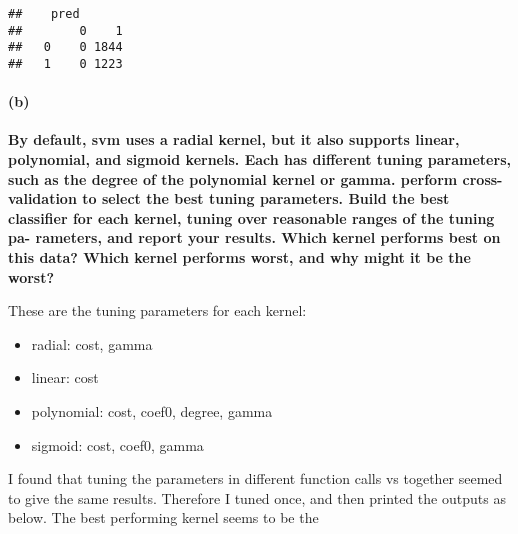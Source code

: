 \documentclass[]{article}
\providecommand{\tightlist}{%
  \setlength{\itemsep}{0pt}\setlength{\parskip}{0pt}}
\let\oldparagraph\paragraph
\renewcommand{\paragraph}[1]{\oldparagraph{#1}\mbox{}}
\begin{document}
\begin{verbatim}
##    pred
##        0    1
##   0    0 1844
##   1    0 1223
\end{verbatim}

\paragraph{(b)}\label{b}

\textbf{By default, svm uses a radial kernel, but it also supports
linear, polynomial, and sigmoid kernels. Each has different tuning
parameters, such as the degree of the polynomial kernel or gamma.
perform cross-validation to select the best tuning parameters. Build the
best classifier for each kernel, tuning over reasonable ranges of the
tuning pa- rameters, and report your results. Which kernel performs best
on this data? Which kernel performs worst, and why might it be the
worst?}

These are the tuning parameters for each kernel:

\begin{itemize}
\tightlist
\item
  radial: cost, gamma
\item
  linear: cost
\item
  polynomial: cost, coef0, degree, gamma
\item
  sigmoid: cost, coef0, gamma
\end{itemize}

I found that tuning the parameters in different function calls vs
together seemed to give the same results. Therefore I tuned once, and
then printed the outputs as below. The best performing kernel seems to
be the
\end{document}
